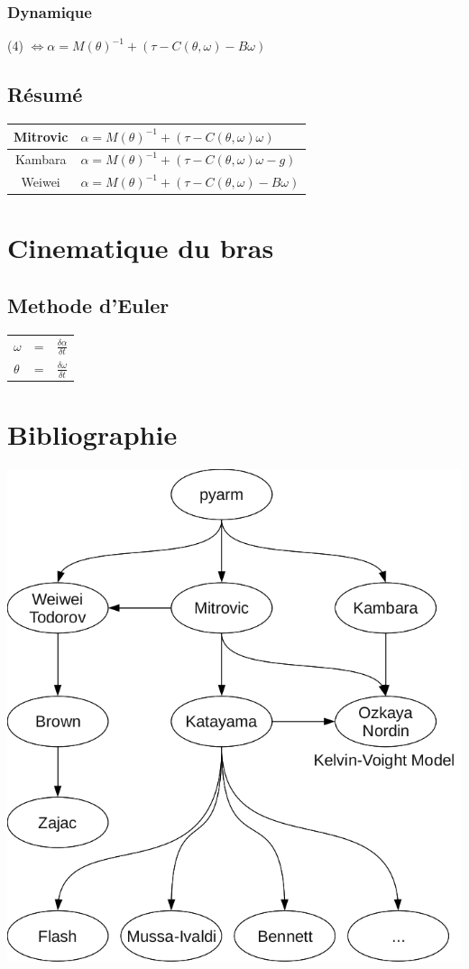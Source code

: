 \documentclass[pdftex,a4paper,11pt]{article}
\begin{document}
\subsubsection{Dynamique}
(4) $\Leftrightarrow \alpha = M(\theta)^{-1} + (\tau - C(\theta, \omega) - B\omega) $

\subsection{Résumé}
\begin{tabular}{|c|l|}
    \hline
    Mitrovic  & $\alpha = M(\theta)^{-1} + (\tau - C(\theta, \omega) \omega)$ \\
    \hline
    Kambara  & $\alpha = M(\theta)^{-1} + (\tau - C(\theta, \omega) \omega - g)$ \\
    \hline
    Weiwei  & $\alpha = M(\theta)^{-1} + (\tau - C(\theta, \omega) - B\omega)$ \\
    \hline
\end{tabular}


\section{Cinematique du bras}

\subsection{Methode d'Euler}

\begin{tabular}{lcl}
    $\omega$ & = & $\frac{\delta \alpha}{\delta t}$ \\
    $\theta$ & = & $\frac{\delta \omega}{\delta t}$ \\
\end{tabular}
    

\section{Bibliographie}

\begin{center}
        \includegraphics[width=.80\linewidth]{fig/bib}
\end{center}
\end{document}
